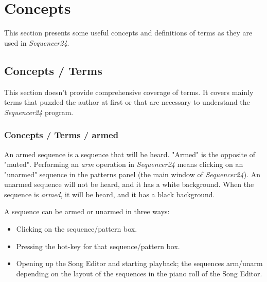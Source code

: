 %
%
%

\section{Concepts}
\label{sec:concepts}

   This section presents some useful concepts and definitions of terms as
   they are used in \textsl{Sequencer24}.

\subsection{Concepts / Terms}
\label{subsec:concepts_terms}

   This section doesn't provide comprehensive coverage of terms.  It
   covers mainly terms that puzzled the author at first or that are
   necessary to understand the \textsl{Sequencer24} program.

\subsubsection{Concepts / Terms / armed}
\label{subsubsec:concepts_terms_armed}

   An armed sequence is a sequence that will be heard.
   "Armed" is the opposite of "muted".
   Performing an \textsl{arm} operation in \textsl{Sequencer24} means clicking on
   an "unarmed" sequence in the patterns panel (the main window of
   \textsl{Sequencer24}).  An unarmed sequence will not be heard, and it
   has a white background.  When the sequence is \textsl{armed},
   it will be heard, and it has a black background.

   A sequence can be armed or unarmed in three ways:

   \begin{itemize}
      \item Clicking on the sequence/pattern box.
      \item Pressing the hot-key for that sequence/pattern box.
      \item Opening up the Song Editor and starting playback; the
            sequences arm/unarm depending on the layout of the
            sequences in the piano roll of the Song Editor.
   \end{itemize}

